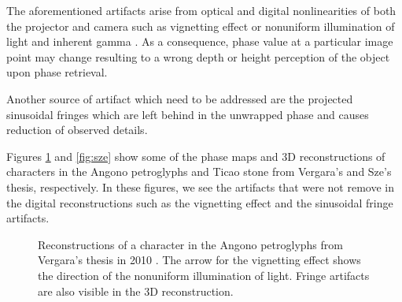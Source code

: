The aforementioned artifacts arise from optical and digital nonlinearities of both the projector and camera such as vignetting effect or nonuniform illumination of light and inherent gamma \cite{Liu2010, Gorthi2010, Juang2007}. 
As a consequence, phase value at a particular image point may change resulting to a wrong depth or height perception of
the object upon phase retrieval.

Another source of artifact which need to be addressed are the projected sinusoidal fringes which are left behind in the unwrapped phase and causes reduction of observed details.

Figures \ref{fig:vergara} and \ref{fig:sze} show some of the phase maps and 3D reconstructions of characters in the Angono petroglyphs and Ticao stone from Vergara's \cite{Vergara2010} and Sze's \cite{Sze2012} thesis, respectively. In these figures, we see the artifacts that were not remove in the digital reconstructions such as the vignetting effect and the sinusoidal fringe artifacts.

\captionsetup[figure]{width=5in}
\begin{figure}[h!t]
	\centering
	\caption[Reconstructions from Vergara's thesis]{Reconstructions of a  character in the Angono petroglyphs from Vergara's thesis in 2010 \cite{Vergara2010}. The arrow for the vignetting effect shows the direction of the nonuniform illumination of light. Fringe artifacts are also visible in the 3D reconstruction.}
	\label{fig:vergara}
\end{figure}

